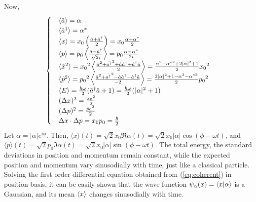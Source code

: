 \documentclass[12pt, twoside]{article}
\begin{document}
Now, 
\begin{equation}
\begin{cases}

	&{ \langle \hat{a} \rangle = \alpha }\\
	&{ \langle \hat{a}^\dagger \rangle = \alpha^* }\\
	&{ \langle x \rangle = x _ { 0 } \left( \frac { \hat{a}+ \hat{a} ^ { \dagger } } { 2 } \right) = x _ { 0 } \frac{\alpha + \alpha^*}{2}}\\
	& { \langle p \rangle = p_0  \left\langle \frac { \hat{a}- \hat{a} ^ { \dagger } } { \sqrt { 2 } i } \right\rangle =  p_0 \frac{\alpha - \alpha^*}{2i} }\\
	& { \langle \hat{x}^2 \rangle = {x_0}^2  \left\langle \frac { \hat{a}^2 + \hat{a^ { \dagger }}^2 + \hat{a}\hat{a}^\dagger + \hat{a}^\dagger \hat{a} } { 2 } \right\rangle =  \frac{\alpha^2 + \alpha^{*2} + 2|\alpha|^2 + 1 }{2}{x_0}^2}\\
	& { \langle \hat{p}^2 \rangle = {p_0}^2  \left\langle \frac { \hat{a}^2 + \hat{a^ { \dagger }}^2 - \hat{a}\hat{a}^\dagger - \hat{a}^\dagger \hat{a} } { -2 } \right\rangle = \frac{ 2|\alpha|^2 + 1 -\alpha^2 - \alpha^{*2} }{2}{p_0}^2}\\
	& \expval{E} = \frac{\hbar\omega}{2}(\hat{a}^{\dagger}\hat{a}+1) = \frac{\hbar\omega}{2}(|\alpha|^2 + 1)\\
	& (\Delta x)^2 = \frac{{x_0}^2}{2}\\
	& (\Delta p)^2 = \frac{{p_0}^2}{2}\\
	& \Delta x \cdot \Delta p = x_0 p_0 = \frac{\hbar}{2} 
	
	\end{cases}\end{equation}
Let $\alpha = |\alpha|e^{i\phi}$. Then, $\langle x \rangle (t) $$= \sqrt{2} x_0 \Re{\alpha(t)} $$= \sqrt{2} x_0 |\alpha| \cos(\phi-\omega t)$, and $ \langle p \rangle (t) $$= \sqrt{2} p_0 \Im{\alpha(t)} $$= \sqrt{2} x_0 |\alpha| \sin(\phi-\omega t)$. The total energy, the standard deviations in position and momentum remain constant, while the expected position and momentum vary sinusodially with time, just like a classical particle. Solving the first order differential equation obtained from (\ref{eq:coherent}) in position basis, it can be easily shown that the wave function $\psi_\alpha (x) = \braket{x}{\alpha}$ is a Gaussian, and its mean $\expval{x}$ changes sinusodially with time.
\end{document}

